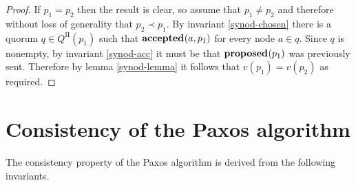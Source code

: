 \documentclass[journal]{IEEEtran}
\begin{document}
\begin{proof} If $p_1 = p_2$ then the result is clear, so assume that $p_1 \ne
p_2$ and therefore without loss of generality that ${p_2 \prec p_1}$. By
invariant \ref{synod-chosen} there is a quorum $q \in Q^\textrm{II}(p_1)$ such
that $\mathbf{accepted}_{}(a,p_1)$ for every node $a \in q$. Since $q$ is nonempty, by
invariant \ref{synod-acc} it must be that $\mathbf{proposed}_{}(p_1)$ was previously sent.
Therefore by lemma \ref{synod-lemma} it follows that $v(p_1) = v(p_2)$ as
required.  \end{proof}




\section{Consistency of the Paxos algorithm}

The consistency property of the Paxos algorithm is derived from the following
invariants.
\end{document}
